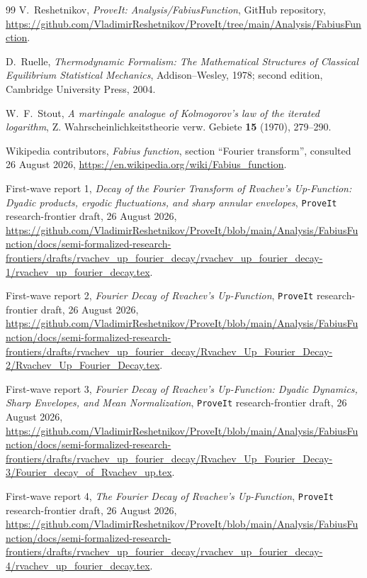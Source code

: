 \documentclass[11pt,oneside]{article}
\theoremstyle{definition}
\theoremstyle{remark}
\begin{document}
\begin{thebibliography}{99}
V.~Reshetnikov,
\newblock \emph{ProveIt: Analysis/FabiusFunction}, GitHub repository,
\newblock \url{https://github.com/VladimirReshetnikov/ProveIt/tree/main/Analysis/FabiusFunction}.

D.~Ruelle,
\newblock \emph{Thermodynamic Formalism: The Mathematical Structures of
Classical Equilibrium Statistical Mechanics},
\newblock Addison--Wesley, 1978; second edition, Cambridge University Press,
2004.

W.~F.~Stout,
\newblock \emph{A martingale analogue of Kolmogorov's law of the iterated
logarithm},
\newblock Z. Wahrscheinlichkeitstheorie verw. Gebiete \textbf{15} (1970),
279--290.

Wikipedia contributors,
\newblock \emph{Fabius function}, section ``Fourier transform'',
\newblock consulted 26 August 2026,
\newblock \url{https://en.wikipedia.org/wiki/Fabius_function}.

First-wave report 1,
\newblock \emph{Decay of the Fourier Transform of Rvachev's Up-Function:
Dyadic products, ergodic fluctuations, and sharp annular envelopes},
\newblock \texttt{ProveIt} research-frontier draft, 26 August 2026,
\newblock \url{https://github.com/VladimirReshetnikov/ProveIt/blob/main/Analysis/FabiusFunction/docs/semi-formalized-research-frontiers/drafts/rvachev_up_fourier_decay/rvachev_up_fourier_decay-1/rvachev_up_fourier_decay.tex}.

First-wave report 2,
\newblock \emph{Fourier Decay of Rvachev's Up-Function},
\newblock \texttt{ProveIt} research-frontier draft, 26 August 2026,
\newblock \url{https://github.com/VladimirReshetnikov/ProveIt/blob/main/Analysis/FabiusFunction/docs/semi-formalized-research-frontiers/drafts/rvachev_up_fourier_decay/Rvachev_Up_Fourier_Decay-2/Rvachev_Up_Fourier_Decay.tex}.

First-wave report 3,
\newblock \emph{Fourier Decay of Rvachev's Up-Function: Dyadic Dynamics,
Sharp Envelopes, and Mean Normalization},
\newblock \texttt{ProveIt} research-frontier draft, 26 August 2026,
\newblock \url{https://github.com/VladimirReshetnikov/ProveIt/blob/main/Analysis/FabiusFunction/docs/semi-formalized-research-frontiers/drafts/rvachev_up_fourier_decay/Rvachev_Up_Fourier_Decay-3/Fourier_decay_of_Rvachev_up.tex}.

First-wave report 4,
\newblock \emph{The Fourier Decay of Rvachev's Up-Function},
\newblock \texttt{ProveIt} research-frontier draft, 26 August 2026,
\newblock \url{https://github.com/VladimirReshetnikov/ProveIt/blob/main/Analysis/FabiusFunction/docs/semi-formalized-research-frontiers/drafts/rvachev_up_fourier_decay/rvachev_up_fourier_decay-4/rvachev_up_fourier_decay.tex}.


\end{thebibliography}
\end{document}
